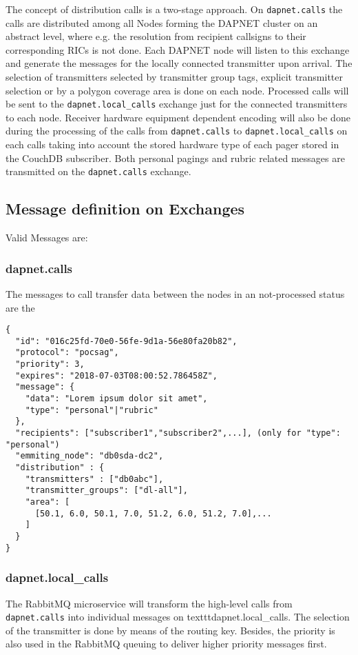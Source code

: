 The concept of distribution calls is a two-stage approach. On \texttt{dapnet.calls} the calls are distributed among all Nodes forming the DAPNET cluster on an abstract level, where e.g. the resolution from recipient callsigns to their corresponding RICs is not done. Each DAPNET node will listen to this exchange and generate the messages for the locally connected transmitter upon arrival. The selection of transmitters selected by transmitter group tags, explicit transmitter selection or by a polygon coverage area is done on each node. Processed calls will be sent to the \texttt{dapnet.local\_calls} exchange just for the connected transmitters to each node. Receiver hardware equipment dependent encoding will also be done during the processing of the calls from \texttt{dapnet.calls} to \texttt{dapnet.local\_calls} on each calls taking into account the stored hardware type of each pager stored in the CouchDB subscriber. Both personal pagings and rubric related messages are transmitted on the \texttt{dapnet.calls} exchange.


\subsection{Message definition on Exchanges}
\label{protocoldef:RabbitMQ:exchangesdifinition}


Valid Messages are:

\subsubsection{dapnet.calls}
\label{protocoldef:RabbitMQ:dapnet.calls}
The messages to call transfer data between the nodes in an not-processed status are the 
\begin{lstlisting}
{
  "id": "016c25fd-70e0-56fe-9d1a-56e80fa20b82",
  "protocol": "pocsag",
  "priority": 3,
  "expires": "2018-07-03T08:00:52.786458Z",
  "message": {
    "data": "Lorem ipsum dolor sit amet",
    "type": "personal"|"rubric"
  },
  "recipients": ["subscriber1","subscriber2",...], (only for "type": "personal")
  "emmiting_node": "db0sda-dc2",
  "distribution" : {
    "transmitters" : ["db0abc"],
    "transmitter_groups": ["dl-all"],
    "area": [
      [50.1, 6.0, 50.1, 7.0, 51.2, 6.0, 51.2, 7.0],...
    ]
  }
}
\end{lstlisting}

\subsubsection{dapnet.local\_calls}
\label{protocoldef:RabbitMQ:dapnet.local_calls}
The RabbitMQ microservice will transform the high-level calls from \texttt{dapnet.calls} into individual messages on texttt{dapnet.local\_calls}. The selection of the transmitter is done by means of the routing key. Besides, the priority is also used in the RabbitMQ queuing to deliver higher priority messages first.

